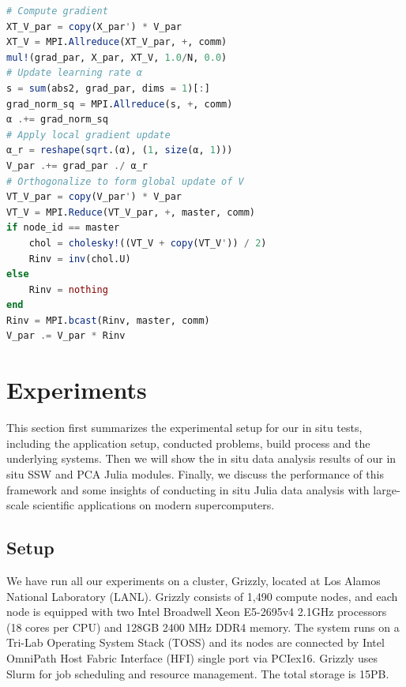 \documentclass{juliacon}
\begin{document}
\begin{minipage}{\linewidth}
\begin{lstlisting}[language = Julia, caption={Key algorithmic steps of TributaryPCA in Julia.}]
# Compute gradient
XT_V_par = copy(X_par') * V_par
XT_V = MPI.Allreduce(XT_V_par, +, comm)
mul!(grad_par, X_par, XT_V, 1.0/N, 0.0)
# Update learning rate α
s = sum(abs2, grad_par, dims = 1)[:]
grad_norm_sq = MPI.Allreduce(s, +, comm) 
α .+= grad_norm_sq 
# Apply local gradient update
α_r = reshape(sqrt.(α), (1, size(α, 1)))
V_par .+= grad_par ./ α_r
# Orthogonalize to form global update of V
VT_V_par = copy(V_par') * V_par
VT_V = MPI.Reduce(VT_V_par, +, master, comm)
if node_id == master
    chol = cholesky!((VT_V + copy(VT_V')) / 2)
    Rinv = inv(chol.U)
else
    Rinv = nothing
end
Rinv = MPI.bcast(Rinv, master, comm)
V_par .= V_par * Rinv
\end{lstlisting}
\end{minipage}





\section{Experiments}

This section first summarizes the experimental setup for our in situ tests, including the application setup, conducted problems, build process and the underlying systems. Then we will show the in situ data analysis results of our in situ SSW and PCA Julia modules. Finally, we discuss the performance of this framework and some insights of conducting in situ Julia data analysis with large-scale scientific applications on modern supercomputers.


\subsection{Setup}

We have run all our experiments on a cluster, Grizzly, located at Los Alamos National Laboratory (LANL). Grizzly consists of 1,490 compute nodes, and each node is equipped with two Intel Broadwell Xeon E5-2695v4 2.1GHz processors (18 cores per CPU) and 128GB 2400 MHz DDR4 memory.
The system runs on a Tri-Lab Operating System Stack (TOSS) and its nodes are connected by Intel OmniPath Host Fabric Interface (HFI) single port via PCIex16.
Grizzly uses Slurm for job scheduling and resource management. The total storage is 15PB.
\end{document}
